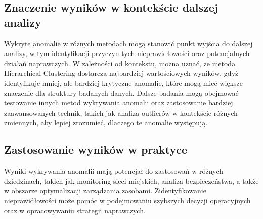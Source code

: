 \documentclass[a4paper,fleqn]{cas-dc}
\begin{document}
\subsection{Znaczenie wyników w kontekście dalszej analizy}
Wykryte anomalie w różnych metodach mogą stanowić punkt wyjścia do dalszej analizy, w tym identyfikacji przyczyn tych nieprawidłowości oraz potencjalnych działań naprawczych. W zależności od kontekstu, można uznać, że metoda Hierarchical Clustering dostarcza najbardziej wartościowych wyników, gdyż identyfikuje mniej, ale bardziej krytyczne anomalie, które mogą mieć większe znaczenie dla struktury badanych danych.
Dalsze badania mogą obejmować testowanie innych metod wykrywania anomalii oraz zastosowanie bardziej zaawansowanych technik, takich jak analiza outlierów w kontekście różnych zmiennych, aby lepiej zrozumieć, dlaczego te anomalie występują.
\subsection{Zastosowanie wyników w praktyce}
Wyniki wykrywania anomalii mają potencjał do zastosowań w różnych dziedzinach, takich jak monitoring sieci miejskich, analiza bezpieczeństwa, a także w obszarze optymalizacji zarządzania zasobami. Zidentyfikowanie nieprawidłowości może pomóc w podejmowaniu szybszych decyzji operacyjnych oraz w opracowywaniu strategii naprawczych.
%
\newpage



\end{document}
